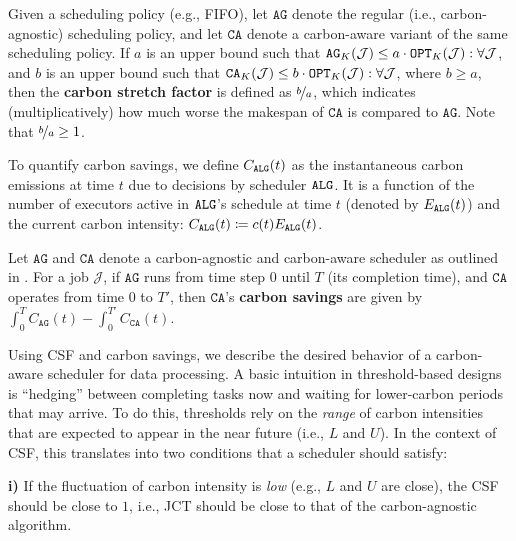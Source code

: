 \vspace{-0.5em}
\begin{dfn} \label{dfn:csf}
Given a scheduling policy (e.g., FIFO), let $\texttt{AG}$ denote the regular (i.e., carbon-agnostic) scheduling policy, and let $\texttt{CA}$ denote a carbon-aware variant of the same scheduling policy.
If $a$ is an upper bound such that $\texttt{AG}_K(\mathcal{J}) \leq a \cdot \texttt{OPT}_K(\mathcal{J}) : \forall \mathcal{J}$, and $b$ is an upper bound such that $\texttt{CA}_K(\mathcal{J}) \leq b \cdot \texttt{OPT}_K(\mathcal{J}) : \forall \mathcal{J}$, where $b \geq a$, then the \textbf{carbon stretch factor} is defined as $\nicefrac{b}{a}$, which indicates (multiplicatively) how much worse the makespan of $\texttt{CA}$ is compared to $\texttt{AG}$. Note that $\nicefrac{b}{a} \geq 1$. 
\end{dfn}
\vspace{-0.5em}



\noindent To quantify carbon savings, we define $C_\texttt{ALG}(t)$ as the instantaneous carbon emissions at time $t$ due to decisions by scheduler $\texttt{ALG}$.  It is a function of the number of executors active in $\texttt{ALG}$'s schedule at time $t$ (denoted by $E_\texttt{ALG}(t)$) and the current carbon intensity: $C_\texttt{ALG}(t) \coloneqq c(t) E_\texttt{ALG} (t)$.

\begin{dfn} \label{dfn:carbonsavings}
Let $\texttt{AG}$ and $\texttt{CA}$ denote a carbon-agnostic and carbon-aware scheduler as outlined in . %
For a job $\mathcal{J}$, if $\texttt{AG}$ runs from time step $0$ until $T$ (its completion time), and $\texttt{CA}$ operates from time $0$ to $T'$, %
then $\texttt{CA}$'s \textbf{carbon savings} are given by $\int_0^T C_{\texttt{AG}}(t) - \int_0^{T'} C_{\texttt{CA}}(t)$.
\end{dfn}

\noindent Using CSF and carbon savings, we describe the desired behavior of a carbon-aware scheduler for data processing.
A basic intuition in threshold-based designs is ``hedging'' between completing tasks now and waiting for lower-carbon periods that may arrive. 
To do this, thresholds rely on the \textit{range} of carbon intensities that are expected to appear in the near future (i.e., $L$ and $U$).  In the context of CSF, this translates into two conditions that a scheduler should satisfy:

\textbf{i) } If the fluctuation of carbon intensity is \textit{low} (e.g., $L$ and $U$ are close), the CSF should be close to $1$, i.e., JCT should be close to that of the carbon-agnostic algorithm.  

